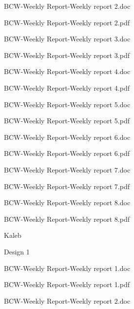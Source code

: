 \documentclass[conference]{IEEEtran}
\begin{document}
                \indent \indent \indent \indent BCW-Weekly Report-Weekly report 2.doc 
                
               \indent \indent \indent \indent  BCW-Weekly Report-Weekly report 2.pdf 
                
                \indent \indent \indent \indent BCW-Weekly Report-Weekly report 3.doc 
                
                \indent \indent \indent \indent BCW-Weekly Report-Weekly report 3.pdf 
                
                \indent \indent \indent \indent BCW-Weekly Report-Weekly report 4.doc 
                
                \indent \indent \indent \indent BCW-Weekly Report-Weekly report 4.pdf 
                
                \indent \indent \indent \indent BCW-Weekly Report-Weekly report 5.doc 
                
                \indent \indent \indent \indent BCW-Weekly Report-Weekly report 5.pdf 
                
                \indent \indent \indent \indent BCW-Weekly Report-Weekly report 6.doc 
                
                \indent \indent \indent \indent BCW-Weekly Report-Weekly report 6.pdf 
                
               \indent \indent \indent \indent  BCW-Weekly Report-Weekly report 7.doc 
                
                \indent \indent \indent \indent BCW-Weekly Report-Weekly report 7.pdf 
                
                \indent \indent \indent \indent BCW-Weekly Report-Weekly report 8.doc 
                
               \indent \indent \indent \indent  BCW-Weekly Report-Weekly report 8.pdf 
                
        \indent \indent Kaleb 
        
            \indent \indent \indent Design 1 
            
                \indent \indent \indent \indent  BCW-Weekly Report-Weekly report 1.doc 
                
                \indent \indent \indent \indent BCW-Weekly Report-Weekly report 1.pdf 
                
               \indent \indent \indent \indent  BCW-Weekly Report-Weekly report 2.doc 
                
\end{document}
